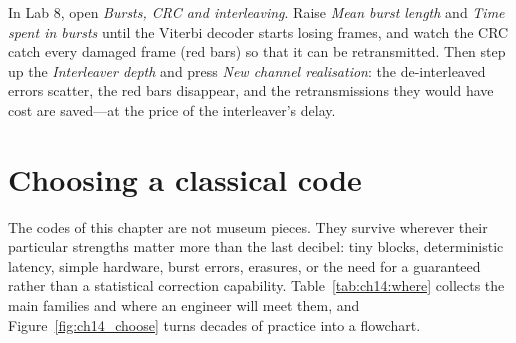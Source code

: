 \begin{tryit}
In Lab 8, open \emph{Bursts, CRC and interleaving}. Raise \emph{Mean burst length} and \emph{Time spent
in bursts} until the Viterbi decoder starts losing frames, and watch the CRC catch every damaged frame
(red bars) so that it can be retransmitted. Then step up the \emph{Interleaver depth} and press \emph{New
channel realisation}: the de-interleaved errors scatter, the red bars disappear, and the retransmissions
they would have cost are saved---at the price of the interleaver's delay.
\end{tryit}

\section{Choosing a classical code}
\label{sec:ch14:choosing}

The codes of this chapter are not museum pieces. They survive wherever their particular strengths
matter more than the last decibel: tiny blocks, deterministic latency, simple hardware, burst errors,
erasures, or the need for a guaranteed rather than a statistical correction capability.
Table~\ref{tab:ch14:where} collects the main families and where an engineer will meet them, and
Figure~\ref{fig:ch14_choose} turns decades of practice into a flowchart.

